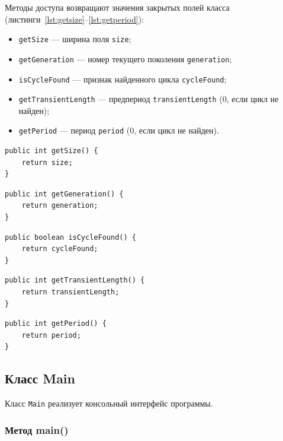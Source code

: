 \documentclass[a4paper,14pt]{extarticle}
\begin{document}
Методы доступа возвращают значения закрытых полей класса (листинги~\ref{lst:getsize}--\ref{lst:getperiod}):
\begin{itemize}
	\item \texttt{getSize} --- ширина поля \texttt{size};
	\item \texttt{getGeneration} --- номер текущего поколения \texttt{generation};
	\item \texttt{isCycleFound} --- признак найденного цикла \texttt{cycleFound};
	\item \texttt{getTransientLength} --- предпериод \texttt{transientLength} (0, если цикл не найден);
	\item \texttt{getPeriod} --- период \texttt{period} (0, если цикл не найден).
\end{itemize}

\begin{lstlisting}[caption={Метод getSize()}, label={lst:getsize}]
public int getSize() {
	return size;
}
\end{lstlisting}

\begin{lstlisting}[caption={Метод getGeneration()}, label={lst:getgeneration}]
public int getGeneration() {
	return generation;
}
\end{lstlisting}

\begin{lstlisting}[caption={Метод isCycleFound()}, label={lst:iscyclefound}]
public boolean isCycleFound() {
	return cycleFound;
}
\end{lstlisting}

\begin{lstlisting}[caption={Метод getTransientLength()}, label={lst:gettransient}]
public int getTransientLength() {
	return transientLength;
}
\end{lstlisting}

\begin{lstlisting}[caption={Метод getPeriod()}, label={lst:getperiod}]
public int getPeriod() {
	return period;
}
\end{lstlisting}

\subsection{Класс Main}

Класс \texttt{Main} реализует консольный интерфейс программы.

\subsubsection*{Метод main()}
\end{document}
